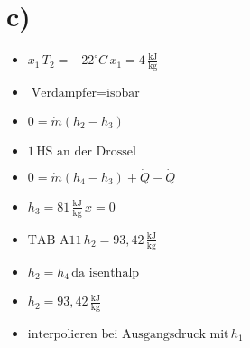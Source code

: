 

\section*{c)}

\begin{itemize}
    \item \( x_1 \, T_2 = -22^\circ C \, x_1 = 4 \, \frac{\text{kJ}}{\text{kg}} \)
    \item \( \text{Verdampfer} = \text{isobar} \)
    \item \( 0 = \dot{m} (h_2 - h_3) \)
    \item \( 1 \, \text{HS an der Drossel} \)
    \item \( 0 = \dot{m} (h_4 - h_3) + \dot{Q} - \dot{Q} \)
    \item \( h_3 = 81 \, \frac{\text{kJ}}{\text{kg}} \, x = 0 \)
    \item \( \text{TAB A11} \, h_2 = 93,42 \, \frac{\text{kJ}}{\text{kg}} \)
    \item \( h_2 = h_4 \, \text{da isenthalp} \)
    \item \( h_2 = 93,42 \, \frac{\text{kJ}}{\text{kg}} \)
    \item \( \text{interpolieren bei Ausgangsdruck mit} \, h_1 \)
\end{itemize}